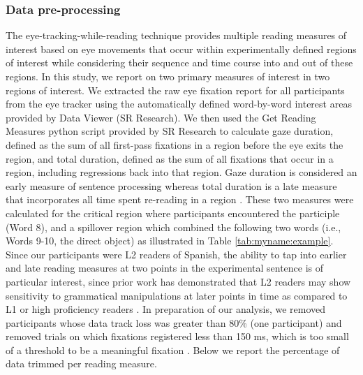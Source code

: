 \documentclass[output=paper,colorlinks,citecolor=brown]{langscibook}
\begin{document}
\subsubsection{Data pre-processing}
The eye-tracking-while-reading technique provides multiple reading measures of interest based on eye movements that occur within experimentally defined regions of interest while considering their sequence and time course into and out of these regions. In this study, we report on two primary measures of interest in two regions of interest. We extracted the raw eye fixation report for all participants from the eye tracker using the automatically defined word-by-word interest areas provided by Data Viewer (SR Research). We then used the Get Reading Measures python script provided by SR Research to calculate gaze duration, defined as the sum of all first-pass fixations in a region before the eye exits the region, and total duration, defined as the sum of all fixations that occur in a region, including regressions back into that region. Gaze duration is considered an early measure of sentence processing whereas total duration is a late measure that incorporates all time spent re-reading in a region \citep{Rayner1998}. These two measures were calculated for the critical region where participants encountered the participle (Word 8), and a spillover region which combined the following two words (i.e., Words 9-10, the direct object) as illustrated in Table \ref{tab:myname:example}. Since our participants were L2 readers of Spanish, the ability to tap into earlier and late reading measures at two points in the experimental sentence is of particular interest, since prior work has demonstrated that L2 readers may show sensitivity to grammatical manipulations at later points in time as compared to L1 or high proficiency readers \citep{Avery2019,Godfroid2019}. In preparation of our analysis, we removed participants whose data track loss was greater than 80\% (one participant) and removed trials on which fixations registered less than 150 ms, which is too small of a threshold to be a meaningful fixation \citep{Rayner1998}. Below we report the percentage of data trimmed per reading measure.
\end{document}
